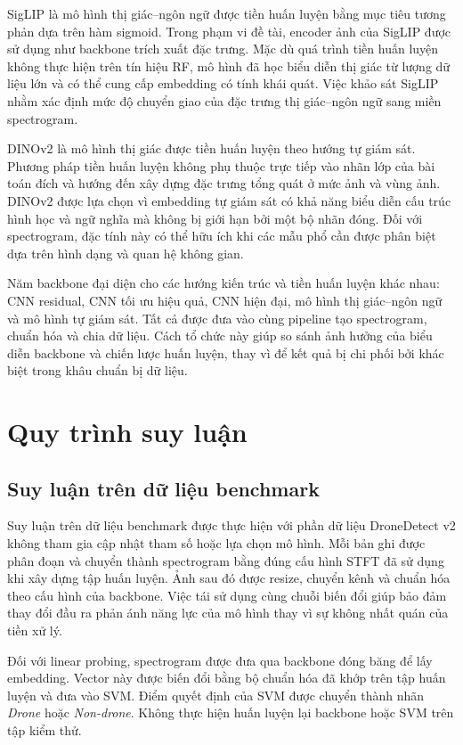 \documentclass[../DoAn.tex]{subfiles}
\begin{document}
SigLIP là mô hình thị giác--ngôn ngữ được tiền huấn luyện bằng mục tiêu tương phản dựa trên hàm sigmoid. Trong phạm vi đề tài, encoder ảnh của SigLIP được sử dụng như backbone trích xuất đặc trưng. Mặc dù quá trình tiền huấn luyện không thực hiện trên tín hiệu RF, mô hình đã học biểu diễn thị giác từ lượng dữ liệu lớn và có thể cung cấp embedding có tính khái quát. Việc khảo sát SigLIP nhằm xác định mức độ chuyển giao của đặc trưng thị giác--ngôn ngữ sang miền spectrogram.

DINOv2 là mô hình thị giác được tiền huấn luyện theo hướng tự giám sát. Phương pháp tiền huấn luyện không phụ thuộc trực tiếp vào nhãn lớp của bài toán đích và hướng đến xây dựng đặc trưng tổng quát ở mức ảnh và vùng ảnh. DINOv2 được lựa chọn vì embedding tự giám sát có khả năng biểu diễn cấu trúc hình học và ngữ nghĩa mà không bị giới hạn bởi một bộ nhãn đóng. Đối với spectrogram, đặc tính này có thể hữu ích khi các mẫu phổ cần được phân biệt dựa trên hình dạng và quan hệ không gian.

Năm backbone đại diện cho các hướng kiến trúc và tiền huấn luyện khác nhau: CNN residual, CNN tối ưu hiệu quả, CNN hiện đại, mô hình thị giác--ngôn ngữ và mô hình tự giám sát. Tất cả được đưa vào cùng pipeline tạo spectrogram, chuẩn hóa và chia dữ liệu. Cách tổ chức này giúp so sánh ảnh hưởng của biểu diễn backbone và chiến lược huấn luyện, thay vì để kết quả bị chi phối bởi khác biệt trong khâu chuẩn bị dữ liệu.

\section{Quy trình suy luận}

\subsection{Suy luận trên dữ liệu benchmark}

Suy luận trên dữ liệu benchmark được thực hiện với phần dữ liệu DroneDetect v2 không tham gia cập nhật tham số hoặc lựa chọn mô hình. Mỗi bản ghi được phân đoạn và chuyển thành spectrogram bằng đúng cấu hình STFT đã sử dụng khi xây dựng tập huấn luyện. Ảnh sau đó được resize, chuyển kênh và chuẩn hóa theo cấu hình của backbone. Việc tái sử dụng cùng chuỗi biến đổi giúp bảo đảm thay đổi đầu ra phản ánh năng lực của mô hình thay vì sự không nhất quán của tiền xử lý.

Đối với linear probing, spectrogram được đưa qua backbone đóng băng để lấy embedding. Vector này được biến đổi bằng bộ chuẩn hóa đã khớp trên tập huấn luyện và đưa vào SVM. Điểm quyết định của SVM được chuyển thành nhãn \textit{Drone} hoặc \textit{Non-drone}. Không thực hiện huấn luyện lại backbone hoặc SVM trên tập kiểm thử.
\end{document}
